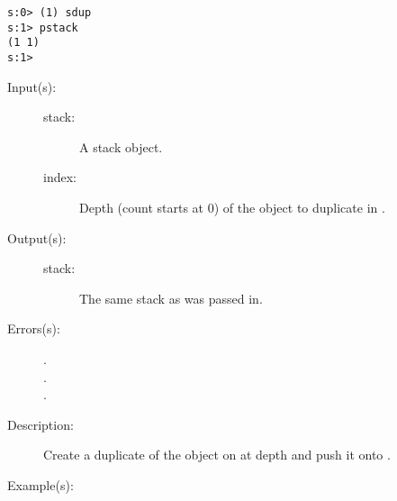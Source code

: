 \begin{description}
\begin{description}
\begin{verbatim}
s:0> (1) sdup
s:1> pstack
(1 1)
s:1>
		\end{verbatim}
	\end{description}
\label{systemdict:sindex}
\item[{\onyxop{stack index}{sindex}{stack}}: ]
	\begin{description}\item[]
	\item[Input(s): ]
		\begin{description}\item[]
		\item[stack: ]
			A stack object.
		\item[index: ]
			Depth (count starts at 0) of the object to duplicate in
			.
		\end{description}
	\item[Output(s): ]
		\begin{description}\item[]
		\item[stack: ]
			The same stack as was passed in.
		\end{description}
	\item[Errors(s): ]
		\begin{description}\item[]
		\item[.]
		\item[.]
		\item[.]
		\end{description}
	\item[Description: ]
		Create a duplicate of the object on  at depth
		 and push it onto .
	\item[Example(s): ]\begin{verbatim}


\end{verbatim}
\end{description}
\end{description}
